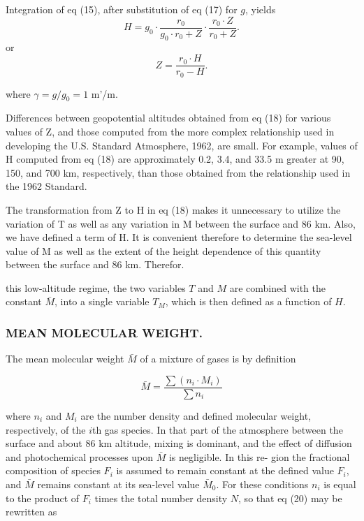 \documentclass{article}
\begin{document}
Integration of eq (15), after substitution of eq (17) for \(g\), yields
\begin{equation}
 H = g_0 \cdot \frac{r_0}{g_0 \cdot r_0 + Z} \cdot \frac{r_0 \cdot Z}{r_0 + Z}. \tag{18}
\end{equation}
or
\begin{equation}
 Z = \frac{r_0 \cdot H}{r_0 - H}. \tag{19}
\end{equation}

where \(\gamma = g/g_0 = 1\) m'/m.

Differences between geopotential altitudes obtained from eq (18) for various values of Z, and those computed from the more complex relationship used in developing the U.S. Standard Atmosphere, 1962, are small. For example, values of H computed from eq (18) are approximately 0.2, 3.4, and 33.5 m greater at 90, 150, and 700 km, respectively, than those obtained from the relationship used in the 1962 Standard.

The transformation from Z to H in eq (18) makes it unnecessary to utilize the variation of T as well as any variation in M between the surface and 86 km. Also, we have defined a term of H. It is convenient therefore to determine the sea-level value of M as well as the extent of the height dependence of this quantity between the surface and 86 km. Therefor.

\noindent this low-altitude regime, the two variables \(T\) and \(M\) are combined with the constant \(\bar{M}\), into a single variable \(T_M\), which is then defined as a function of \(H\).

\subsubsection{MEAN MOLECULAR WEIGHT.}
The mean molecular weight \(\bar{M}\) of a mixture of gases is by definition

\begin{equation}
 \bar{M} = \frac{\sum (n_i \cdot M_i)}{\sum n_i} \tag{20}
\end{equation}

where \(n_i\) and \(M_i\) are the number density and defined molecular weight, respectively, of the \(i\)th gas species. In that part of the atmosphere between the surface and about 86 km altitude, mixing is dominant, and the effect of diffusion and photochemical processes upon \(\bar{M}\) is negligible. In this re- gion the fractional composition of species \(F_i\) is assumed to remain constant at the defined value \(F_i\), and \(\bar{M}\) remains constant at its sea-level value \(\bar{M}_0\). For these conditions \(n_i\) is equal to the product of \(F_i\) times the total number density \(N\), so that eq (20) may be rewritten as
\end{document}
